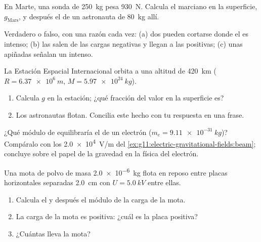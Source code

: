 \begin{exercise}[$\star$]\label{exo:g11:electric-gravitational-fields:4}
En Marte, una sonda de \qty{250}{kg} pesa \qty{930}{N}. Calcula el 
marciano en la superficie, $g_{\text{Mars}}$, y después el  de un
astronauta de \qty{80}{kg} allí.
\end{exercise}

\begin{exercise}[$\star$]\label{exo:g11:electric-gravitational-fields:5}
Verdadero o falso, con una razón cada vez: (a) dos 
pueden cortarse donde el  es intenso; (b) las  salen
de las cargas negativas y llegan a las positivas; (c) unas  apiñadas señalan un  intenso.
\end{exercise}

\begin{exercise}[$\star\star$]\label{exo:g11:electric-gravitational-fields:6}
La Estación Espacial Internacional orbita a una altitud de
\qty{420}{km} ($R = \qty{6.37e6}{m}$, $M = \qty{5.97e24}{kg}$).
\begin{enumerate}
  \item Calcula $g$ en la estación; ¿qué fracción del valor en la
        superficie es?
  \item Los astronautas flotan. Concilia este hecho con tu respuesta en
        una frase.
\end{enumerate}
\end{exercise}

\begin{exercise}[$\star\star$]\label{exo:g11:electric-gravitational-fields:7}
¿Qué módulo de  equilibraría el  de un electrón
($m_e = \qty{9.11e-31}{kg}$)? Compáralo con los \qty{2.0e4}{V/m} del
\cref{ex:g11:electric-gravitational-fields:beam}; concluye sobre el
papel de la gravedad en la física del electrón.
\end{exercise}

\begin{exercise}[$\star\star$]\label{exo:g11:electric-gravitational-fields:8}
Una mota de polvo de masa \qty{2.0e-6}{kg} flota en reposo entre placas
horizontales separadas \qty{2.0}{cm} con $U = \qty{5.0}{kV}$ entre
ellas.
\begin{enumerate}
  \item Calcula el  y después el módulo de la carga de la mota.
  \item La carga de la mota es positiva: ¿cuál es la placa positiva?
  \item ¿Cuántas  lleva la mota?
\end{enumerate}
\end{exercise}

